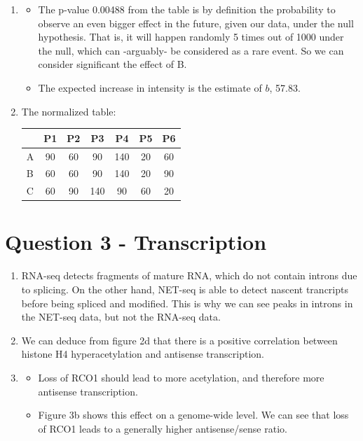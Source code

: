 \documentclass[a4paper,11pt]{article}
\begin{document}
\begin{enumerate}
\item \begin{itemize}
	\item The p-value 0.00488 from the table is by definition the probability to observe an even bigger effect in the future, 
	given our data, under the null hypothesis. That is, it will happen randomly 5 times out of 1000 under the null, 
	which can -arguably- be considered as a rare event.
	So we can consider significant the effect of B.
	\item The expected increase in intensity is the estimate of $b$, 57.83.
	\end{itemize}
\item The normalized table:

\begin{table}[h!]
\centering
\begin{tabular}{l | cccccc}
   & P1 & P2 & P3 & P4 & P5 & P6\\
\hline
A & 90   & 60   & 90  & 140 & 20 & 60 \\
B & 60   & 60   & 90  & 140 & 20 & 90 \\
C & 60   & 90   & 140 & 90  & 60 & 20 \\  
\end{tabular}
\end{table}

\end{enumerate}

\section*{Question 3 - Transcription}

\begin{enumerate}
\item RNA-seq detects fragments of mature RNA, which do not contain
  introns due to splicing. On the other hand, NET-seq is able to
  detect nascent trancripts before being spliced and modified. This is
  why we can see peaks in introns in the NET-seq data, but not the
  RNA-seq data. 
\item We can deduce from figure 2d that there is a positive
  correlation between histone H4 hyperacetylation and antisense
  transcription. 
\item
	\begin{itemize}
	\item Loss of RCO1 should lead to more acetylation, and
          therefore more antisense transcription. 
	\item Figure 3b shows this effect on a genome-wide level. We
          can see that loss of RCO1 leads to a generally higher
          antisense/sense ratio. 
	\end{itemize}
\end{enumerate}
\end{document}
